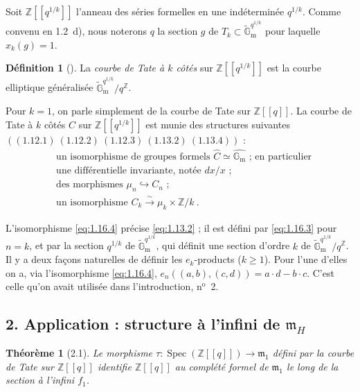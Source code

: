 \documentclass[12pt,a4paper]{amsart}
\theoremstyle{plain}
\newtheorem{theoreme}[proposition]{Th\'eor\`eme}
\theoremstyle{definition}
\newtheorem{definition}[proposition]{D\'efinition}
\theoremstyle{remark}
\DeclareMathOperator{\Spec}{Spec}
\newcommand{\ZZ}{\mathbb{Z}}
\newcommand{\Gm}{\mathbb{G}_\mathrm{m}}
\newcommand{\Gmtilde}{\widetilde{\mathbb{G}}_\mathrm{m}}
\begin{document}
Soit $\ZZ[[q^{1/k}]]$ l'anneau des s\'eries formelles en une ind\'etermin\'ee $q^{1/k}$. Comme convenu en 1.2~d), nous noterons $q$ la section $g$ de $T_k \subset \Gmtilde^{q^{1/k}}$ pour laquelle $x_k(g) = 1$.

\begin{definition}[\theproposition]
La \emph{courbe de Tate \`a $k$ c\^ot\'es} sur $\ZZ[[q^{1/k}]]$ est la courbe elliptique g\'en\'eralis\'ee $\Gmtilde^{q^{1/k}} / q^{\ZZ}$.

Pour $k = 1$, on parle simplement de la courbe de Tate sur $\ZZ[[q]]$. La courbe de Tate \`a $k$ c\^ot\'es $C$ sur $\ZZ[[q^{1/k}]]$ est munie des structures suivantes $((1.12.1)\ (1.12.2)\ (1.12.3)\ (1.13.2)\ (1.13.4))$ :
\begin{align}
\label{eq:1.16.1}
&\text{un isomorphisme de groupes formels } \widehat{C} \simeq \widehat{\Gm} \text{ ; en particulier} \\
\label{eq:1.16.2}
&\text{une diff\'erentielle invariante, not\'ee } dx/x \text{ ;} \\
\label{eq:1.16.3}
&\text{des morphismes } \mu_n \hookrightarrow C_n \text{ ;} \\
\label{eq:1.16.4}
&\text{un isomorphisme } C_k \xrightarrow{\sim} \mu_k \times \ZZ/k \ .
\end{align}

L'isomorphisme \eqref{eq:1.16.4} pr\'ecise \eqref{eq:1.13.2} ; il est d\'efini par \eqref{eq:1.16.3} pour $n = k$, et par la section $q^{1/k}$ de $\Gmtilde^{q^{1/k}}$, qui d\'efinit une section d'ordre $k$ de $\Gmtilde^{q^{1/k}} / q^{\ZZ}$. Il y a deux fa\c{c}ons naturelles de d\'efinir les $e_k$-products ($k \geq 1$). Pour l'une d'elles on a, via l'isomorphisme \eqref{eq:1.16.4}, $e_n((a,b),(c,d)) = a \cdot d - b \cdot c$. C'est celle qu'on avait utilis\'ee dans l'introduction, n$^\mathrm{o}$~2.
\end{definition}


\subsection*{2. Application : structure \`a l'infini de $\mathfrak{m}_H$}

\setcounter{proposition}{0}

\begin{theoreme}[2.1]
Le morphisme $\tau : \Spec(\ZZ[[q]]) \rightarrow \mathfrak{m}_1$ d\'efini par la courbe de Tate sur $\ZZ[[q]]$ identifie $\ZZ[[q]]$ au compl\'et\'e formel de $\mathfrak{m}_1$ le long de la section \`a l'infini $f_1$.
\end{theoreme}
\end{document}
